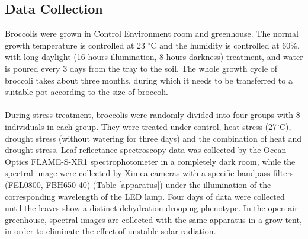 \documentclass[12pt,a4paper]{article}
\begin{document}
\subsection{Data Collection}
Broccolis were grown in Control Environment room and greenhouse. The normal growth temperature is controlled at 23 $^{\circ}$C and the humidity is controlled at 60\%, with long daylight (16 hours illumination, 8 hours darkness) treatment, and water is poured every 3 days from the tray to the soil. The whole growth cycle of broccoli takes about three months, during which it needs to be transferred to a suitable pot according to the size of broccoli.
\\
\\
During stress treatment, broccolis were randomly divided into four groups with 8 individuals in each group. They were treated under control, heat stress (27$^{\circ}$C), drought stress (without watering for three days) and the combination of heat and drought stress. Leaf reflectance spectroscopy data was collected by the Ocean Optics FLAME-S-XR1 spectrophotometer in a completely dark room, while the spectral image were collected by Ximea cameras with a specific bandpass filters (FEL0800, FBH650-40) (Table \ref{apparatus}) under the illumination of the corresponding wavelength of the LED lamp. Four days of data were collected until the leaves show a distinct dehydration drooping phenotype. In the open-air greenhouse, spectral images are collected with the same apparatus in a grow tent, in order to eliminate the effect of unstable solar radiation.
\end{document}
